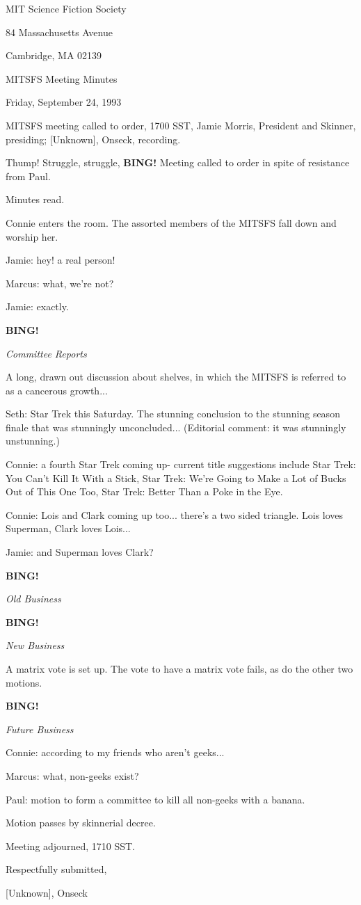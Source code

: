 \documentclass[12pt]{article}
\newcommand{\bing}{{\bf BING!} }
\newcommand{\goto}[1]{\bing \vskip 12pt \centerline{{\em{#1}}}}
\begin{document}
\begin{center}

MIT Science Fiction Society 

84 Massachusetts Avenue

Cambridge, MA 02139

\vspace{12pt}

MITSFS Meeting Minutes 

Friday, September 24, 1993

\end{center}
 
\vspace{18pt}

\setlength{\parskip}{6pt}

\noindent
MITSFS meeting called to order, 1700 SST,
Jamie Morris, President and Skinner, presiding; [Unknown], Onseck, recording.

Thump! Struggle, struggle, \bing Meeting called to order in spite of resistance from Paul.

Minutes read.

Connie enters the room. The assorted members of the MITSFS fall down and worship her.

Jamie: hey! a real person!

Marcus: what, we're not?

Jamie: exactly.

\goto{Committee Reports}

A long, drawn out discussion about shelves, in which the MITSFS is referred to as a cancerous growth...

Seth: Star Trek this Saturday. The stunning conclusion to the stunning season finale that was stunningly unconcluded... (Editorial comment: it was stunningly unstunning.)

Connie: a fourth Star Trek coming up- current title suggestions include Star Trek: You Can't Kill It With a Stick, Star Trek: We're Going to Make a Lot of Bucks Out of This One Too, Star Trek: Better Than a Poke in the Eye.

Connie: Lois and Clark coming up too... there's a two sided triangle. Lois loves Superman, Clark loves Lois...

Jamie: and Superman loves Clark?

\goto{Old Business}

\goto{New Business}

A matrix vote is set up. The vote to have a matrix vote fails, as do the other two motions.

\goto{Future Business}

Connie: according to my friends who aren't geeks...

Marcus: what, non-geeks exist?

Paul: motion to form a committee to kill all non-geeks with a banana.

Motion passes by skinnerial decree.

\vspace{12pt}

\noindent
Meeting adjourned, 1710 SST.

\vspace{18pt}

\centerline{Respectfully submitted,}
\centerline{[Unknown], Onseck}
\end{document}
